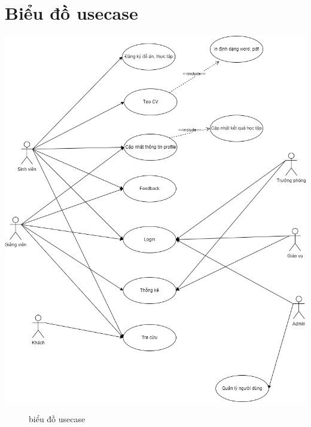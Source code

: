 \section{Biểu đồ usecase}
\begin{center}
	\includegraphics[width=1.\textwidth]{image/use_case.png}
	\begin{figure}[h]
		\centering
		\caption{biểu đồ usecase}
	\end{figure}
\end{center}

